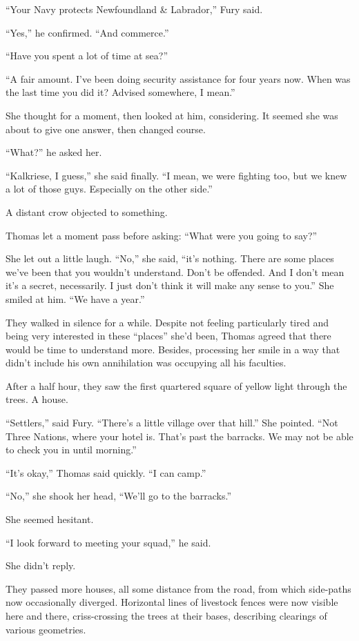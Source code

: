 \documentclass[11pt,a5paper]{article}
\begin{document}
``Your Navy protects Newfoundland \& Labrador,'' Fury said.

``Yes,'' he confirmed. ``And commerce.''

``Have you spent a lot of time at sea?''

``A fair amount. I've been doing security assistance for four years now. When was the last time you did it? Advised somewhere, I mean.''

She thought for a moment, then looked at him, considering. It seemed she was about to give one answer, then changed course.

``What?'' he asked her.

``Kalkriese, I guess,'' she said finally. ``I mean, we were fighting too, but we knew a lot of those guys. Especially on the other side.''

A distant crow objected to something.

Thomas let a moment pass before asking: ``What were you going to say?''

She let out a little laugh. ``No,'' she said, ``it's nothing. There are some places we've been that you wouldn't understand. Don't be offended. And I don't mean it's a secret, necessarily. I just don't think it will make any sense to you.'' She smiled at him. ``We have a year.''

They walked in silence for a while. Despite not feeling particularly tired and being very interested in these ``places'' she'd been, Thomas agreed that there would be time to understand more. Besides, processing her smile in a way that didn't include his own annihilation was occupying all his faculties.

After a half hour, they saw the first quartered square of yellow light through the trees. A house.

``Settlers,'' said Fury. ``There's a little village over that hill.'' She pointed. ``Not Three Nations, where your hotel is. That's past the barracks. We may not be able to check you in until morning.''

``It's okay,'' Thomas said quickly. ``I can camp.''

``No,'' she shook her head, ``We'll go to the barracks.''

She seemed hesitant.

``I look forward to meeting your squad,'' he said.

She didn't reply.

They passed more houses, all some distance from the road, from which side-paths now occasionally diverged. Horizontal lines of livestock fences were now visible here and there, criss-crossing the trees at their bases, describing clearings of various geometries.
\end{document}
